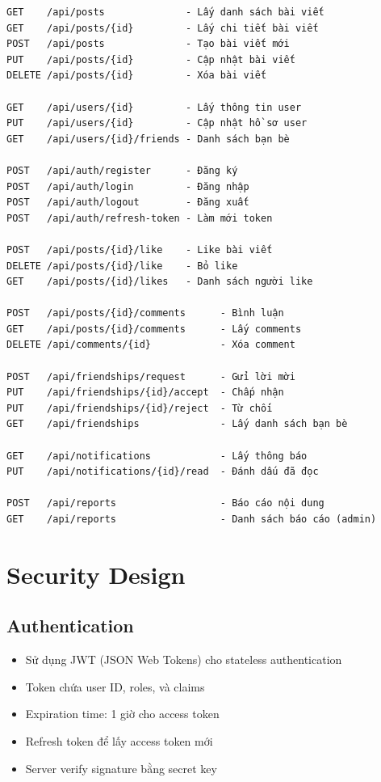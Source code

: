 \begin{verbatim}
GET    /api/posts              - Lấy danh sách bài viết
GET    /api/posts/{id}         - Lấy chi tiết bài viết
POST   /api/posts              - Tạo bài viết mới
PUT    /api/posts/{id}         - Cập nhật bài viết
DELETE /api/posts/{id}         - Xóa bài viết

GET    /api/users/{id}         - Lấy thông tin user
PUT    /api/users/{id}         - Cập nhật hồ sơ user
GET    /api/users/{id}/friends - Danh sách bạn bè

POST   /api/auth/register      - Đăng ký
POST   /api/auth/login         - Đăng nhập
POST   /api/auth/logout        - Đăng xuất
POST   /api/auth/refresh-token - Làm mới token

POST   /api/posts/{id}/like    - Like bài viết
DELETE /api/posts/{id}/like    - Bỏ like
GET    /api/posts/{id}/likes   - Danh sách người like

POST   /api/posts/{id}/comments      - Bình luận
GET    /api/posts/{id}/comments      - Lấy comments
DELETE /api/comments/{id}            - Xóa comment

POST   /api/friendships/request      - Gửi lời mời
PUT    /api/friendships/{id}/accept  - Chấp nhận
PUT    /api/friendships/{id}/reject  - Từ chối
GET    /api/friendships              - Lấy danh sách bạn bè

GET    /api/notifications            - Lấy thông báo
PUT    /api/notifications/{id}/read  - Đánh dấu đã đọc

POST   /api/reports                  - Báo cáo nội dung
GET    /api/reports                  - Danh sách báo cáo (admin)
\end{verbatim}

\section{Security Design}

\subsection{Authentication}
\begin{itemize}
    \item Sử dụng JWT (JSON Web Tokens) cho stateless authentication
    \item Token chứa user ID, roles, và claims
    \item Expiration time: 1 giờ cho access token
    \item Refresh token để lấy access token mới
    \item Server verify signature bằng secret key
\end{itemize}

